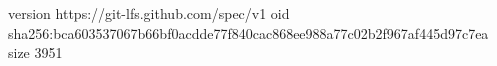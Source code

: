 version https://git-lfs.github.com/spec/v1
oid sha256:bca603537067b66bf0acdde77f840cac868ee988a77c02b2f967af445d97c7ea
size 3951
